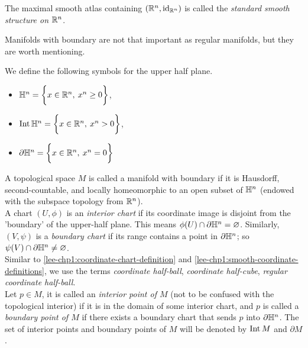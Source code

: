 \documentclass[../main-manifolds.tex]{subfiles}
\begin{document}
\begin{definition}\label{lee-chp1:standard-smooth-structure-realn}
    The maximal smooth atlas containing $({\mathbb{R}^n},\operatorname{id}_{{\mathbb{R}^n}})$ is called the \emph{standard smooth structure on ${\mathbb{R}^n}$}.
\end{definition}

Manifolds with boundary are not that important as regular manifolds, but they are worth mentioning.
\begin{definition}\label{lee-chp1:upper-half-plane-definitions}
    We define the following symbols for the upper half plane.
    \begin{itemize}
        \item ${\mathbb{H}^n} = \biggl\{{x\in{\mathbb{R}^n},\: x^n\geq 0}\biggr\}$,
        \item $\operatorname{Int}{\mathbb{H}^n} = \biggl\{{x\in{\mathbb{R}^n},\: x^n > 0}\biggr\}$,
        \item $\partial{\mathbb{H}^n} = \biggl\{{x\in{\mathbb{R}^n},\: x^n = 0}\biggr\}$
    \end{itemize}
\end{definition}
\begin{definition}\label{lee-chp1:manifolds-with-boundary-definition}
    A topological space $M$ is called a manifold with boundary if it is Hausdorff, second-countable, and locally homeomorphic to an open subset of ${\mathbb{H}^n}$ (endowed with the subspace topology from ${\mathbb{R}^n}$).\\

    A chart $(U,\phi)$ is an \emph{interior chart} if its coordinate image is disjoint from the 'boundary' of the upper-half plane. This means $\phi(U)\cap \partial{\mathbb{H}^n}=\varnothing$. Similarly, $(V,\psi)$ is a \emph{boundary chart} if its range contains a point in $\partial{\mathbb{H}^n}$; so $\psi(V)\cap\partial{\mathbb{H}^n}\neq\varnothing$.\\

    Similar to \cref{lee-chp1:coordinate-chart-definition} and \cref{lee-chp1:smooth-coordinate-definitions}, we use the terms \emph{coordinate half-ball}, \emph{coordinate half-cube}, \emph{regular coordinate half-ball}.\\

    Let $p\in M$, it is called an \emph{interior point of $M$} (not to be confused with the topological interior) if it is in the domain of some interior chart, and $p$ is called a \emph{boundary point of $M$} if there exists a boundary chart that sends $p$ into $\partial{\mathbb{H}^n}$. The set of interior points and boundary points of $M$ will be denoted by $\operatorname{Int} M$ and $\partial M$.
\end{definition}
\end{document}
